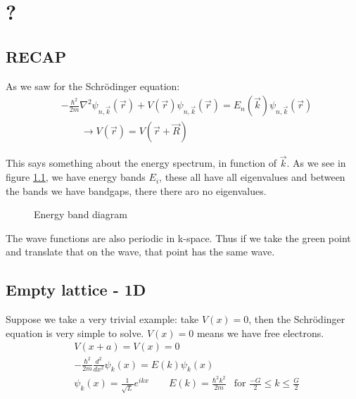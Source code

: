 \chapter{?}
\section{RECAP}
As we saw for the Schrödinger equation:
\begin{align}
    &-\frac{\hbar^2}{2m}\nabla^2\psi_{n, \vec{k}}(\vec{r}) + V(\vec{r})\psi_{n, \vec{k}}(\vec{r}) = E_n(\vec{k})\psi_{n, \vec{k}}(\vec{r}) \\
    & \qquad \rightarrow V(\vec{r}) = V(\vec{r} + \vec{R})
\end{align}

This says something about the energy spectrum, in function of $\vec{k}$. As we see in figure \ref{fig:energybandiagram}, we have energy bands $E_i$, these all have all eigenvalues and between the bands we have bandgaps, there there aro no eigenvalues.\par
\begin{figure}[h]
    \centering
    \caption{Energy band diagram}
    \label{fig:energybandiagram}
\end{figure}
The wave functions are also periodic in k-space. Thus if we take the green point and translate that on the wave, that point has the same wave.

\section{Empty lattice - 1D}
Suppose we take a very trivial example: take $V(x) = 0$, then the Schrödinger equation is very simple to solve. $V(x) = 0$ means we have free electrons.
\begin{align}
    &V(x+a) = V(x) = 0\\
    &-\frac{\hbar^2}{2m}\frac{d^2}{dx^2}\psi_k(x) = E(k)\psi_k(x)\\
    &\psi_k(x) = \frac{1}{\sqrt{L}}e^{ikx} \qquad E(k) = \frac{\hbar^2k^2}{2m} & \text{for }\frac{-G}{2} \leq k \leq \frac{G}{2}\label{eqn:solution}
\end{align}

